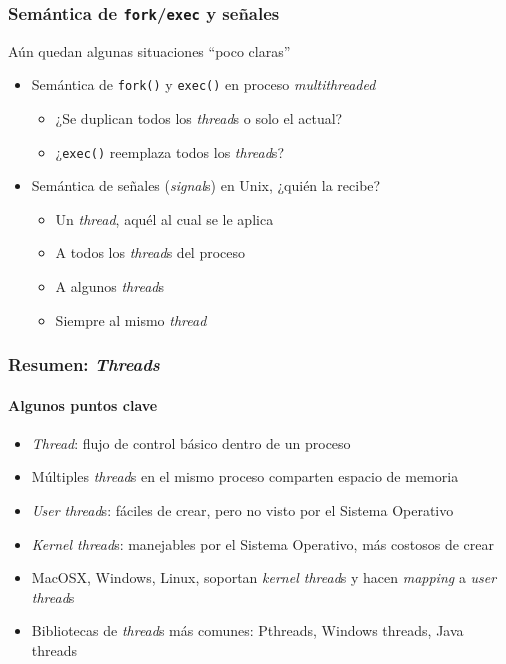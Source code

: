 \documentclass[letter]{beamer}
\begin{document}
\begin{frame}
  \frametitle{Semántica de {\tt fork}/{\tt exec} y señales}
  
  Aún quedan algunas situaciones ``poco claras''
  
  \begin{itemize}
    \item Semántica de {\tt fork()} y {\tt exec()} en proceso {\em multithreaded}
      \begin{itemize}
        \item ¿Se duplican todos los {\em thread}s o solo el actual?
        \item ¿{\tt exec()} reemplaza todos los {\em thread}s?
      \end{itemize}
    \item Semántica de señales ({\em signal}s) en Unix, ¿quién la recibe?
      \begin{itemize}
        \item Un {\em thread}, aquél al cual se le aplica
        \item A todos los {\em thread}s del proceso
        \item A algunos {\em thread}s
        \item Siempre al mismo {\em thread}
      \end{itemize}
  \end{itemize}

\end{frame}

\begin{frame}
  \frametitle{Resumen: {\em Threads}}
  \framesubtitle{Algunos puntos clave}
  
  \begin{itemize}
    \item {\em Thread}: flujo de control básico dentro de un proceso
    \item Múltiples {\em thread}s en el mismo proceso comparten espacio de memoria
    \item {\em User thread}s: fáciles de crear, pero no visto por el Sistema Operativo
    \item {\em Kernel thread}s: manejables por el Sistema Operativo, más costosos de crear
    \item MacOSX, Windows, Linux, soportan {\em kernel thread}s y hacen {\em mapping} a {\em user thread}s
    \item Bibliotecas de {\em thread}s más comunes: Pthreads, Windows threads, Java threads
  \end{itemize}

\end{frame}
\end{document}
